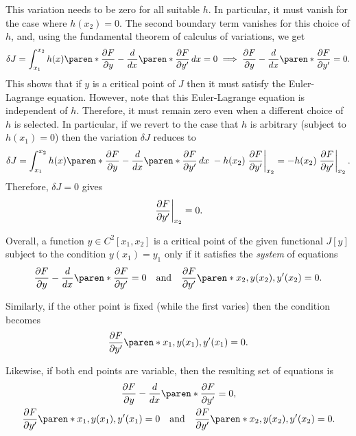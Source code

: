 \documentclass[11pt]{penrose}
\begin{document}
This variation needs to be zero for all suitable $h$. In particular, it must vanish for the case where $h(x_2) = 0$. The second boundary term vanishes for this choice of $h$, and, using the fundamental theorem of calculus of variations, we get
\begin{equation}
    \delta J
    = \int_{x_1}^{x_2} h(x) \paren*{ \frac{\pd F}{\pd y} - \frac{d}{dx}\paren*{\frac{\pd F}{\pd y'}} } \,dx = 0
    \implies
    \frac{\pd F}{\pd y} - \frac{d}{dx}\paren*{\frac{\pd F}{\pd y'}} = 0.
\end{equation}
This shows that if $y$ is a critical point of $J$ then it must satisfy the Euler-Lagrange equation. However, note that this Euler-Lagrange equation is independent of $h$. Therefore, it must remain zero even when a different choice of $h$ is selected. In particular, if we revert to the case that $h$ is arbitrary (subject to $h(x_1) = 0$) then the variation $\delta J$ reduces to
\begin{equation}
    \delta J
    = \int_{x_1}^{x_2} h(x) \paren*{ \frac{\pd F}{\pd y} - \frac{d}{dx}\paren*{\frac{\pd F}{\pd y'}} } \,dx
    \;- h(x_2) \left.\frac{\pd F}{\pd y'}\right|_{x_2}
    = - h(x_2) \left.\frac{\pd F}{\pd y'}\right|_{x_2}.
\end{equation}
Therefore, $\delta J = 0$ gives
\begin{equation}
    \left.\frac{\partial F}{\partial y'}\right|_{x_2} = 0.
\end{equation}

Overall, a function $y \in C^2[x_1, x_2]$ is a critical point of the given functional $J[y]$ subject to the condition $y(x_1) = y_1$ only if it satisfies the \emph{system} of equations
\begin{equation}
    \frac{\pd F}{\pd y} - \frac{d}{dx}\paren*{\frac{\pd F}{\pd y'}} = 0
    \quad\text{and}\quad
    \frac{\pd F}{\pd y'} \paren*{ x_2, y(x_2), y'(x_2) } = 0.
\end{equation}

Similarly, if the other point is fixed (while the first varies) then the condition becomes
\begin{equation}
    \frac{\pd F}{\pd y'} \paren*{ x_1, y(x_1), y'(x_1) } = 0.
\end{equation}

Likewise, if both end points are variable, then the resulting set of equations is
\begin{equation}
    \begin{gathered}
        \frac{\pd F}{\pd y} - \frac{d}{dx}\paren*{\frac{\pd F}{\pd y'}} = 0,\\
        \frac{\pd F}{\pd y'} \paren*{ x_1, y(x_1), y'(x_1) } = 0
        \quad\text{and}\quad
        \frac{\pd F}{\pd y'} \paren*{ x_2, y(x_2), y'(x_2) } = 0.
    \end{gathered}
\end{equation}
\end{document}
